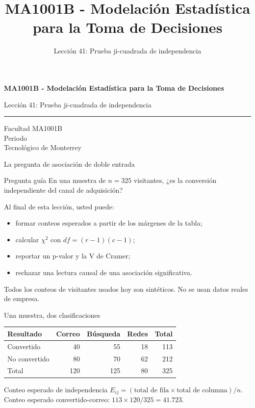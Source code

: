 \documentclass[aspectratio=169,10pt,spanish]{beamer}
\title{MA1001B - Modelación Estadística para la Toma de Decisiones}
\subtitle{Lección 41: Prueba ji-cuadrada de independencia}
\author{}
\institute{Tecnol\'ogico de Monterrey}
\date{}
\begin{document}
\begin{frame}[plain]
  \vspace{1.2cm}
  {\Large\bfseries MA1001B - Modelación Estadística para la Toma de Decisiones\par}
  \vspace{0.7cm}
  {\large Lección 41: Prueba ji-cuadrada de independencia\par}
  \vspace{0.7cm}
  {\color{TecRojo}\rule{\textwidth}{1.2pt}}
  \vspace{0.8cm}

  Facultad MA1001B\\[0.3cm]
  Periodo\\[0.3cm]
  Tecnol\'ogico de Monterrey
\end{frame}

\begin{frame}{La pregunta de asociación de doble entrada}
  \begin{alertblock}{Pregunta guía}
    En una muestra de $n=325$ visitantes, ¿es la conversión independiente
    del canal de adquisición?
  \end{alertblock}

  \vspace{0.6em}
  Al final de esta lección, usted puede:
  \begin{itemize}
    \item formar conteos esperados a partir de los márgenes de la tabla;
    \item calcular $\chi^2$ con $df=(r-1)(c-1)$;
    \item reportar un p-valor y la V de Cramer;
    \item rechazar una lectura causal de una asociación significativa.
  \end{itemize}

  \vfill
  \scriptsize Todos los conteos de visitantes usados hoy son sintéticos. No se usan datos reales de empresa.
\end{frame}

\begin{frame}{Una muestra, dos clasificaciones}
  \small
  \begin{center}
    \begin{tabular}{lrrrr}
      \toprule
      \textbf{Resultado} & \textbf{Correo} & \textbf{Búsqueda} & \textbf{Redes} & \textbf{Total} \\
      \midrule
      Convertido & 40 & 55 & 18 & 113 \\
      No convertido & 80 & 70 & 62 & 212 \\
      \midrule
      Total & 120 & 125 & 80 & 325 \\
      \bottomrule
    \end{tabular}
  \end{center}

  \vspace{0.4em}
  \begin{exampleblock}{Conteo esperado de independencia}
    $E_{ij}=(\text{total de fila}\times\text{total de columna})/n$. Conteo
    esperado convertido-correo: $113\times120/325=41.723$.
  \end{exampleblock}
\end{frame}
\end{document}
